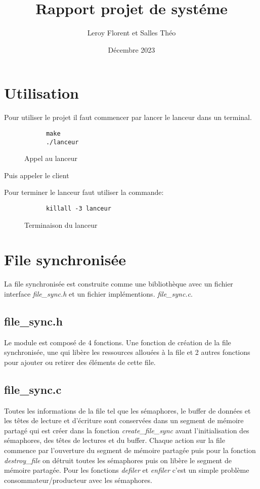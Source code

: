 \documentclass[12pt]{article}
\title{Rapport projet de systéme}
\author{Leroy Florent et Salles Théo}
\date{Décembre 2023}
\begin{document}
\maketitle
\tableofcontents
\newpage
\section{Utilisation}
Pour utiliser le projet il faut commencer par lancer le lanceur dans un
terminal.
\begin{figure}[H]
  \centering
  \begin{verbatim}
      make
      ./lanceur
  \end{verbatim}
  \caption{Appel au lanceur}
\end{figure}
Puis appeler le client

Pour terminer le lanceur faut utiliser la commande:
\begin{figure}[H]
  \centering
  \begin{verbatim}
      killall -3 lanceur
  \end{verbatim}
  \caption{Terminaison du lanceur}
\end{figure}
\section{File synchronisée}
La file synchronisée est construite comme une bibliothèque avec un fichier
interface \textit{file\_sync.h} et un fichier implémentions.
\textit{file\_sync.c}.
\subsection{file\_sync.h}
Le module est composé de 4 fonctions. Une fonction de création de la file
synchronisée, une qui libère les ressources allouées à la file et 2 autres
fonctions pour ajouter
ou retirer des éléments de cette file.
\subsection{file\_sync.c}
Toutes les informations de la file tel que les sémaphores, le buffer de données et les
têtes de lecture
et d'écriture sont conservées dans un segment de mémoire partagé qui est créer
dans la fonction \textit{create\_file\_sync} avant l'initialisation des
sémaphores,
des têtes de lectures et du buffer.
Chaque action sur la file commence par l'ouverture du segment de mémoire
partagée
puis pour la fonction \textit{destroy\_file} on détruit toutes les sémaphores
puis on libère le segment de mémoire partagée. Pour les fonctions
\textit{defiler} et \textit{enfiler}
c'est un simple problème consommateur/producteur avec les sémaphores.
\end{document}
